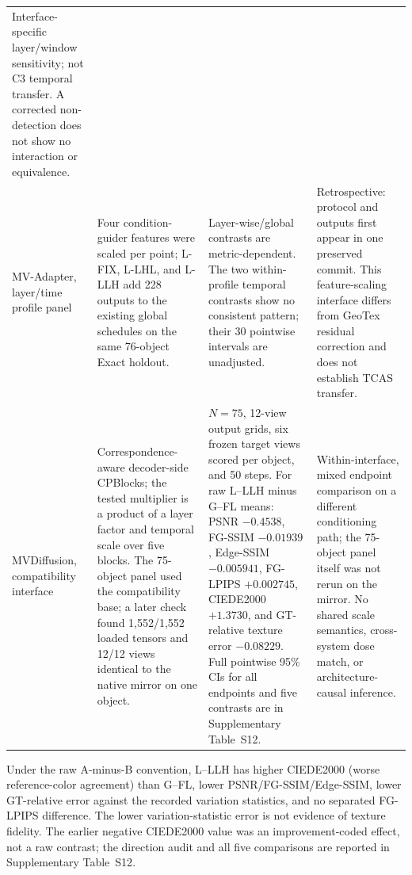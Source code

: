 \documentclass[times,twocolumn,final]{elsarticle}
\providecommand{\DIFadd}[1]{{\protect\color{blue} \sf #1}} %
\providecommand{\DIFaddbegin}{} %
\providecommand{\DIFaddend}{} %
\providecommand{\DIFaddFL}[1]{\DIFadd{#1}} %
\providecommand{\DIFaddbeginFL}{\DIFaddbegin} %
\providecommand{\DIFaddendFL}{\DIFaddend} %
\renewcommand{\DIFaddbeginFL}{}
\renewcommand{\DIFaddendFL}{}
\renewcommand{\DIFaddFL}[1]{#1}
\begin{document}
\begin{table}[t]
\begin{tabular}{p{2.4cm}p{4.0cm}p{4.2cm}p{4.5cm}}
  \DIFaddbeginFL \DIFaddFL{Interface-specific layer/window sensitivity; not }\DIFaddendFL C3   \DIFaddbeginFL \DIFaddFL{temporal transfer. A corrected non-detection does not show no interaction or equivalence. }\\
\DIFaddFL{MV-Adapter, layer/time profile panel }\DIFaddendFL &
  \DIFaddbeginFL \DIFaddFL{Four condition-guider features were scaled per point; L-FIX, L-LHL, and L-LLH add 228 outputs to the existing global schedules on the same 76-object Exact holdout. }\DIFaddendFL &
  \DIFaddbeginFL \DIFaddFL{Layer-wise/global contrasts are metric-dependent. The two within-profile temporal contrasts show no consistent pattern; their 30 pointwise intervals are unadjusted. }\DIFaddendFL &
  \DIFaddbeginFL \DIFaddFL{Retrospective: protocol and outputs first appear in one preserved commit. This feature-scaling interface differs from GeoTex residual correction and does not establish TCAS transfer. }\\
\DIFaddFL{MVDiffusion, compatibility interface }&
\DIFaddFL{Correspondence-aware decoder-side CPBlocks; the tested multiplier is a product of a layer factor and temporal scale over five blocks. The 75-object panel used the compatibility base; a later check found 1,552/1,552 loaded tensors and 12/12 views identical to the native mirror on one object. }&
\DIFaddFL{$N=75$, 12-view output grids, six frozen target views scored per object, and 50 steps. For raw L--LLH minus G--FL means: PSNR $-0.4538$, FG-SSIM $-0.01939$, Edge-SSIM $-0.005941$, FG-LPIPS $+0.002745$, CIEDE2000 $+1.3730$, and GT-relative texture error $-0.08229$. Full pointwise 95\% CIs for all endpoints and five contrasts are in Supplementary Table~S12. }&
\DIFaddFL{Within-interface, mixed endpoint comparison on a different conditioning path; the 75-object panel itself was not rerun on the mirror. No shared scale semantics, cross-system dose match, or architecture-causal inference. }\DIFaddendFL \\
\bottomrule
\end{tabular}
  \DIFaddbegin \end{table}
\DIFaddend 

  \DIFaddbegin \DIFadd{Under the raw A-minus-B convention, L--LLH has higher CIEDE2000 (worse reference-color agreement) than G--FL, lower PSNR/FG-SSIM/Edge-SSIM, lower GT-relative error against the recorded variation statistics, }\DIFaddend and   \DIFaddbegin \DIFadd{no separated FG-LPIPS difference. The lower variation-statistic error is not evidence of texture fidelity. The earlier negative CIEDE2000 value was an improvement-coded effect, not a raw contrast; the direction audit and all five comparisons are reported in Supplementary Table~S12}\DIFaddend .
\end{document}
